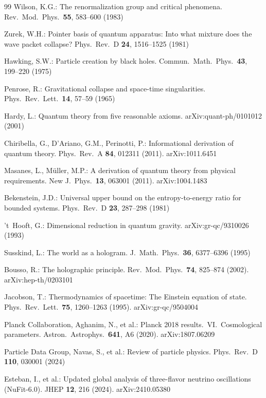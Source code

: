 \documentclass[11pt]{article}
\begin{document}
\begin{thebibliography}{99}
 Wilson, K.G.: The renormalization group and critical phenomena. Rev.\ Mod.\ Phys.\ \textbf{55}, 583--600 (1983)

 Zurek, W.H.: Pointer basis of quantum apparatus: Into what mixture does the wave packet collapse? Phys.\ Rev.\ D \textbf{24}, 1516--1525 (1981)

 Hawking, S.W.: Particle creation by black holes. Commun.\ Math.\ Phys.\ \textbf{43}, 199--220 (1975)

 Penrose, R.: Gravitational collapse and space-time singularities. Phys.\ Rev.\ Lett.\ \textbf{14}, 57--59 (1965)

 Hardy, L.: Quantum theory from five reasonable axioms. arXiv:quant-ph/0101012 (2001)

 Chiribella, G., D'Ariano, G.M., Perinotti, P.: Informational derivation of quantum theory. Phys.\ Rev.\ A \textbf{84}, 012311 (2011). arXiv:1011.6451

 Masanes, L., M\"uller, M.P.: A derivation of quantum theory from physical requirements. New J.\ Phys.\ \textbf{13}, 063001 (2011). arXiv:1004.1483

 Bekenstein, J.D.: Universal upper bound on the entropy-to-energy ratio for bounded systems. Phys.\ Rev.\ D \textbf{23}, 287--298 (1981)

 't~Hooft, G.: Dimensional reduction in quantum gravity. arXiv:gr-qc/9310026 (1993)

 Susskind, L.: The world as a hologram. J.\ Math.\ Phys.\ \textbf{36}, 6377--6396 (1995)

 Bousso, R.: The holographic principle. Rev.\ Mod.\ Phys.\ \textbf{74}, 825--874 (2002). arXiv:hep-th/0203101

 Jacobson, T.: Thermodynamics of spacetime: The Einstein equation of state. Phys.\ Rev.\ Lett.\ \textbf{75}, 1260--1263 (1995). arXiv:gr-qc/9504004

 Planck Collaboration, Aghanim, N., et al.: Planck 2018 results.\ VI.\ Cosmological parameters. Astron.\ Astrophys.\ \textbf{641}, A6 (2020). arXiv:1807.06209

 Particle Data Group, Navas, S., et al.: Review of particle physics. Phys.\ Rev.\ D \textbf{110}, 030001 (2024)

 Esteban, I., et al.: Updated global analysis of three-flavor neutrino oscillations (NuFit-6.0). JHEP \textbf{12}, 216 (2024). arXiv:2410.05380

\end{thebibliography}
\end{document}
